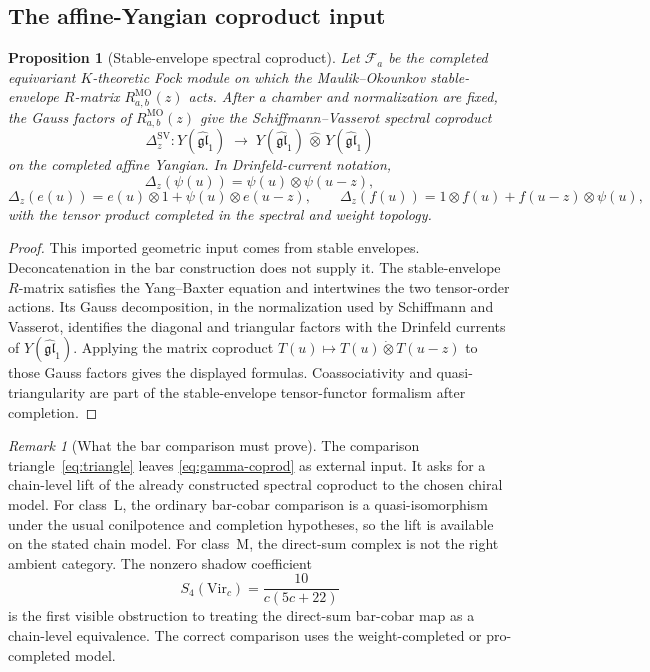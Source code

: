 \documentclass[11pt]{article}
\newtheorem{proposition}[theorem]{Proposition}
\theoremstyle{remark}
\newtheorem{remark}[theorem]{Remark}
\providecommand{\fgl}{\mathfrak{gl}}
\begin{document}
\subsection*{The affine-Yangian coproduct input}

\begin{proposition}[Stable-envelope spectral coproduct]
\label{prop:gamma-inverse}
Let $\mathcal F_a$ be the completed equivariant $K$-theoretic Fock
module on which the Maulik--Okounkov stable-envelope $R$-matrix
$R^{\mathrm{MO}}_{a,b}(z)$ acts.  After a chamber and normalization
are fixed, the Gauss factors of $R^{\mathrm{MO}}_{a,b}(z)$ give the
Schiffmann--Vasserot spectral coproduct
\begin{equation}\label{eq:gamma-coprod}
\Delta_z^{\mathrm{SV}} \colon
Y(\widehat{\fgl}_1)
\;\longrightarrow\;
Y(\widehat{\fgl}_1) \,\widehat{\otimes}\,
Y(\widehat{\fgl}_1)
\end{equation}
on the completed affine Yangian.  In Drinfeld-current notation,
\[
\Delta_z(\psi(u))=\psi(u)\otimes\psi(u-z),
\]
\[
\Delta_z(e(u))=e(u)\otimes 1+\psi(u)\otimes e(u-z),
\qquad
\Delta_z(f(u))=1\otimes f(u)+f(u-z)\otimes\psi(u),
\]
with the tensor product completed in the spectral and weight
topology.
\end{proposition}

\begin{proof}
This imported geometric input comes from stable envelopes.
Deconcatenation in the bar construction does not supply it.  The stable-envelope
$R$-matrix satisfies the Yang--Baxter equation and intertwines the
two tensor-order actions.  Its Gauss decomposition, in the
normalization used by Schiffmann and Vasserot, identifies the diagonal
and triangular factors with the Drinfeld currents of
$Y(\widehat{\fgl}_1)$.  Applying the matrix coproduct
$T(u)\mapsto T(u)\dot\otimes T(u-z)$ to those Gauss factors gives the
displayed formulas.  Coassociativity and quasi-triangularity are part
of the stable-envelope tensor-functor formalism after completion.
\end{proof}

\begin{remark}[What the bar comparison must prove]
\label{rem:class-M-obstruction}
The comparison triangle~\eqref{eq:triangle} leaves
\eqref{eq:gamma-coprod} as external input.  It asks for a chain-level lift of the
already constructed spectral coproduct to the chosen chiral model.
For class~L, the ordinary bar-cobar comparison is a quasi-isomorphism
under the usual conilpotence and completion hypotheses, so the lift is
available on the stated chain model.  For class~M, the direct-sum
complex is not the right ambient category.  The nonzero shadow
coefficient
\[
S_4(\mathrm{Vir}_c)=\frac{10}{c(5c+22)}
\]
is the first visible obstruction to treating the direct-sum
bar-cobar map as a chain-level equivalence.  The correct comparison
uses the weight-completed or pro-completed model.
\end{remark}
\end{document}
